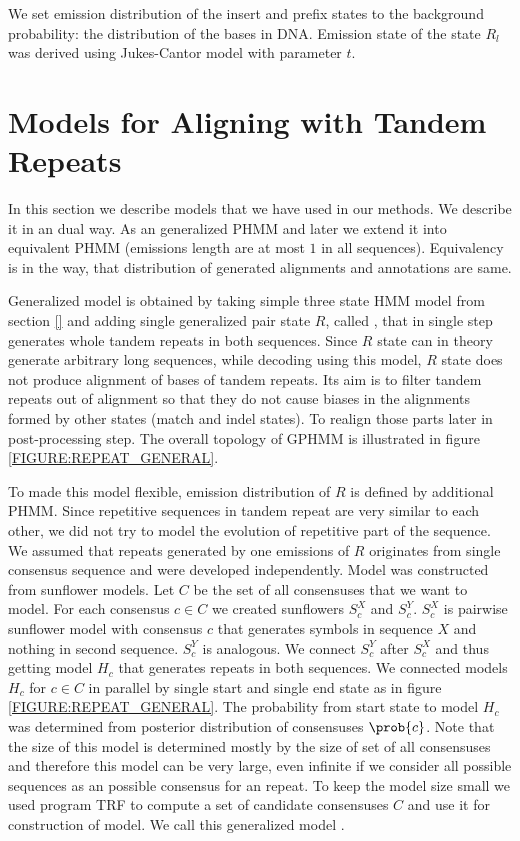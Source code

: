 We set emission distribution of the insert and prefix states to the background
probability: the distribution of the bases in DNA. Emission state of the state
$R_l$ was derived using Jukes-Cantor model with parameter $t$. 

\section{Models for Aligning with Tandem Repeats}\label{SECTION:REPMODELS}
In this section we describe models that we have used in our methods. We
describe it in an dual way. As an generalized PHMM and later we extend it into
equivalent PHMM (emissions length are at most $1$ in all sequences).
Equivalency is in the way, that distribution of generated alignments and
annotations are same.

Generalized model is obtained by taking simple three state HMM model from
section \ref{} and adding single generalized pair state $R$, called
, that in single step generates whole tandem repeats
in both sequences. Since $R$ state can in theory generate arbitrary long
sequences, while decoding using this model, $R$ state does not produce
alignment of bases of tandem repeats. Its aim is to filter tandem repeats out
of alignment so that they do not cause biases in the alignments formed by other
states (match and indel states). To realign those parts later in
post-processing step. The overall topology of GPHMM is illustrated in figure
\ref{FIGURE:REPEAT_GENERAL}.

To made this model flexible, emission distribution of $R$ is defined by
additional PHMM. Since repetitive sequences in tandem repeat are very similar
to each other, we did not try to model the evolution of repetitive part of the
sequence. We assumed that repeats generated by one emissions of $R$ originates
from single consensus sequence and were developed independently. Model was
constructed from sunflower models. Let $C$ be the set of all consensuses that
we want to model. For each consensus $c\in C$ we created sunflowers $S_c^X$ and
$S_c^Y$.  $S_c^X$ is pairwise sunflower model with consensus $c$ that generates
symbols in sequence $X$ and nothing in second sequence. $S_c^Y$ is analogous.
We connect $S_c^Y$ after $S_c^X$ and thus getting model $H_c$ that generates
repeats in both sequences. We connected models $H_c$ for $c\in C$ in parallel
by single start and single end state as in figure \ref{FIGURE:REPEAT_GENERAL}.
The probability from start state to model $H_c$ was determined from posterior
distribution of consensuses $\prob{c}$. Note that the size of this model is
determined mostly by the size of set of all consensuses and therefore this
model can be very large, even infinite if we consider all possible sequences as
an possible consensus for an repeat. To keep the model size small we used
program TRF to compute a set of candidate consensuses $C$ and use it for
construction of model.  We call this generalized model .

